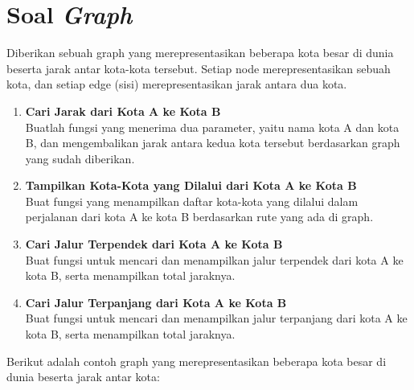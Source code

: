 \section{Soal \textit{Graph}}

Diberikan sebuah graph yang merepresentasikan beberapa kota besar di dunia beserta jarak antar kota-kota tersebut. Setiap node merepresentasikan sebuah kota, dan setiap edge (sisi) merepresentasikan jarak antara dua kota.


\begin{enumerate}
	\item \textbf{Cari Jarak dari Kota A ke Kota B} \\
	Buatlah fungsi yang menerima dua parameter, yaitu nama kota A dan kota B, dan mengembalikan jarak antara kedua kota tersebut berdasarkan graph yang sudah diberikan.
	
	\item \textbf{Tampilkan Kota-Kota yang Dilalui dari Kota A ke Kota B} \\
	Buat fungsi yang menampilkan daftar kota-kota yang dilalui dalam perjalanan dari kota A ke kota B berdasarkan rute yang ada di graph.
	
	\item \textbf{Cari Jalur Terpendek dari Kota A ke Kota B} \\
	Buat fungsi untuk mencari dan menampilkan jalur terpendek dari kota A ke kota B, serta menampilkan total jaraknya.
	
	\item \textbf{Cari Jalur Terpanjang dari Kota A ke Kota B} \\
	Buat fungsi untuk mencari dan menampilkan jalur terpanjang dari kota A ke kota B, serta menampilkan total jaraknya.
\end{enumerate}

Berikut adalah contoh graph yang merepresentasikan beberapa kota besar di dunia beserta jarak antar kota:

